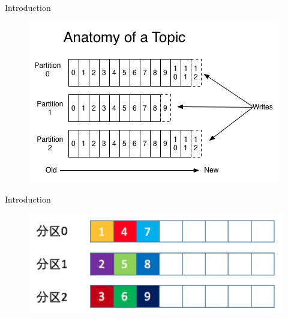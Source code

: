 \begin{frame}[plain,t]{Introduction} %
    \vspace{2ex}
    \begin{figure}
        \centering
        \includegraphics[width=0.8\linewidth]{image/0102}
        \label{fig:0102}
    \end{figure}
    
    
 
\end{frame}
\begin{frame}[plain,t]{Introduction} %
    \vspace{2ex}
    \begin{figure}
        \centering
        \includegraphics[width=0.8\linewidth]{image/0105}
        \label{fig:0105}
    \end{figure}
    
    
    
\end{frame}
